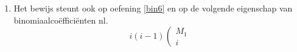 {\begin{enumerate}
\begin{eqnarray*}
\E(X) & = & \sum_{i=0}^ni
\frac{\left(\begin{array}{c}
M_1\\
i
\end{array}
\right)
\left(\begin{array}{c}
M_2\\
n-i
\end{array}
\right)}{
\left(\begin{array}{c}
M_1+M_2\\
n
\end{array}
\right)
}=
\frac{M_1}{
\left(\begin{array}{c}
M_1+M_2\\
n
\end{array}
\right)}
\sum_{i=1}^n
\left(\begin{array}{c}
M_1-1\\
i-1
\end{array}
\right)
\left(\begin{array}{c}
M_2\\
n-i
\end{array}
\right)\\
 & = &
\frac{M_1}{
\left(\begin{array}{c}
M_1+M_2\\
n
\end{array}
\right)}
\sum_{i'=0}^{n-1}
\left(\begin{array}{c}
M_1-1\\
i'
\end{array}
\right)
\left(\begin{array}{c}
M_2\\
n-i'-1
\end{array}
\right)\\
 & = &
\frac{M_1}{
\left(\begin{array}{c}
M_1+M_2\\
n
\end{array}
\right)}
\left(\begin{array}{c}
M_1+M_2-1\\
n-1
\end{array}
\right)=n\frac{M_1}{M_1+M_2}=n\frac{M_1}{M}
\end{eqnarray*}
\item {}
Het bewijs steunt ook op  oefening \ref{bin6}  en op de volgende eigenschap van binomiaalco\"effici\"enten nl.\
$$i(i-1)\left(\begin{array}{c}
M_1\\
i
\end{array}
$$
\end{enumerate}}
